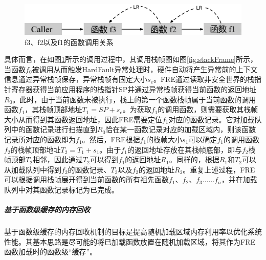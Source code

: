\documentclass[12pt,a4paper]{ctexart}
\numberwithin{figure}{section}
\begin{document}
\begin{figure}[H]
    \centering
    \includegraphics[scale=0.35]{graph/funcCall.png}
    \caption{f3、f2以及f1的函数调用关系}
    \label{fig:funcCall}
\end{figure}
\par 具体而言，在如图\ref{fig:funcCall}所示的调用过程中，其调用栈帧图如图\ref{fig:stackFrame}所示，当函数$f_0$被调用从而触发HardFault异常处理时，硬件自动将产生异常前的上下文信息通过异常栈帧保存，异常栈帧有固定大小$s_e$。FRE通过读取非安全世界的栈指针寄存器获得当前应用程序的栈指针SP并通过异常栈帧获得当前函数的返回地址$R_0$。此时，由于当前函数未被执行，栈上的第一个函数栈帧属于当前函数的调用函数$f_1$，其栈帧顶部地址$T_1=SP+s_e$。为获取$f_1$的调用函数，则需要获取其栈帧大小从而得到其函数返回地址，因此FRE需要定位$f_1$对应的函数记录。它对加载队列中的函数记录进行扫描直到$R_0$恰在某一函数记录对应的加载区域内，则该函数记录所对应的函数即为$f_1$。然后，FRE根据$f_1$的栈帧大小$s_1$可以确定$f_1$的调用函数$f_2$的栈帧顶部地址$T_2=T_1+s_1$。由于$f_1$的返回地址存放在其栈帧底部，即与$f_2$栈帧顶部$T_2$相邻，因此通过$T_2$可以得到$f_1$的返回地址$R_1$。同样的，根据$R_1$和$T_2$可以从加载队列中得到$f_2$的函数记录、$T_3$以及$f_2$的返回地址$R_2$。重复上述过程，FRE可以根据调用栈帧展开得到当前函数的所有祖先函数$f_1、f_2、f_3……f_n$，并在加载队列中对其函数记录标记为已完成。
\subparagraph{基于函数级缓存的内存回收}
\par 基于函数级缓存的内存回收机制的目标是提高随机加载区域内存利用率以优化系统性能。其基本思路是尽可能的将已加载函数放置在随机加载区域，将其作为FRE函数加载时的函数级“缓存”。
\end{document}
